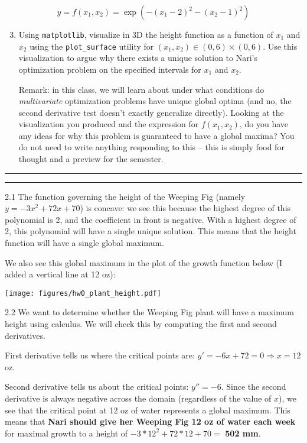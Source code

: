 \documentclass{harvardml}
\theoremstyle{definition}
\theoremstyle{plain}
\newcommand{\question}[2] {\vspace{.25in} \hrule\vspace{0.5em}
\noindent{\bf #1: #2} \vspace{0.5em}
\hrule \vspace{.10in}}
\begin{document}
\begin{problem}
$$y = f(x_1, x_2) = \exp\left(-(x_1 - 2)^2 - (x_2 - 1)^2 \right)$$
\begin{enumerate}
    \setcounter{enumi}{2}
    \item Using \texttt{matplotlib}, visualize in 3D the height function as a function of $x_1$ and $x_2$ using the \texttt{plot\_surface} utility for $(x_1, x_2) \in (0, 6) \times (0, 6)$. Use this visualization to argue why there exists a unique solution to Nari's optimization problem on the specified intervals for $x_1$ and $x_2$.

    Remark: in this class, we will learn about under what conditions do \textit{multivariate} optimization problems have unique global optima (and no, the second derivative test doesn't exactly generalize directly). Looking at the visualization you produced and the expression for $f(x_1, x_2)$, do you have any ideas for why this problem is guaranteed to have a global maxima? You do not need to write anything responding to this -- this is simply food for thought and a preview for the semester.
\end{enumerate}

\end{problem}

\newpage
\question{2}{Optimizing Objectives - Calculus Review}
2.1  The function governing the height of the Weeping Fig (namely $y = -3x^2+72x+70$) is concave: we see this because the highest degree of this polynomial is 2, and the coefficient in front is negative. With a highest degree of 2, this polynomial will have a single unique solution. This means that the height function will have a single global maximum.

We also see this global maximum in the plot of the growth function below (I added a vertical line at 12 oz):

\texttt{[image: figures/hw0\_plant\_height.pdf]}

\medskip

2.2 We want to determine whether the Weeping Fig plant will have a maximum height using calculus. We will check this by computing the first and second derivatives.

First derivative tells us where the critical points are:
$y' = -6x + 72 = 0 \Rightarrow x = 12$ oz.

Second derivative tells us about the critical points:
$y'' = -6$. Since the second derivative is always negative across the domain (regardless of the value of $x$), we see that the critical point at 12 oz of water represents a global maximum. This means that \textbf{Nari should give her Weeping Fig 12 oz of water each week} for maximal growth to a height of $-3*12^2+72*12+70 =$ \textbf{502 mm}.
\end{document}
